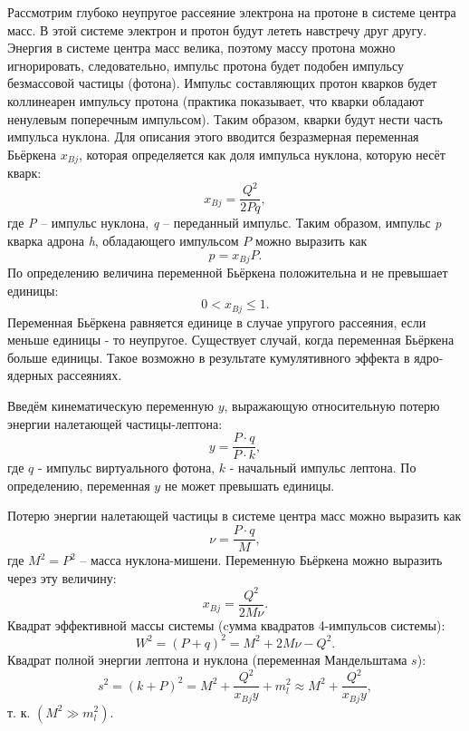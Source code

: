 \documentclass{extarticle}
\begin{document}
Рассмотрим глубоко неупругое рассеяние электрона на протоне в системе центра масс. В этой системе электрон и протон будут лететь навстречу друг другу. Энергия в системе центра масс велика, поэтому массу протона можно игнорировать, следовательно, импульс протона будет подобен импульсу безмассовой частицы (фотона). Импульс составляющих протон кварков будет коллинеарен импульсу протона (практика показывает, что кварки обладают ненулевым поперечным импульсом). Таким образом, кварки будут нести часть импульса нуклона. Для описания этого вводится безразмерная переменная Бьёркена $x_{Bj}$, которая определяется как доля импульса нуклона, которую несёт кварк:
\begin{equation}
    x_{Bj}= \frac{Q^2}{2Pq},
\end{equation}
где \textit{P} -- импульс нуклона, \textit{q} -- переданный импульс. 
Таким образом, импульс \textit{p} кварка адрона \textit{h}, обладающего импульсом $P$ можно выразить как
\begin{equation}
    p=x_{Bj}P.
\end{equation}
По определению величина переменной Бьёркена положительна и не превышает единицы: 
\begin{equation}
    0 < x_{Bj} \leq 1.
\end{equation}
Переменная Бьёркена равняется единице в случае упругого рассеяния, если меньше единицы - то неупругое. Существует случай, когда переменная Бьёркена больше единицы. Такое возможно в результате кумулятивного эффекта в ядро-ядерных рассеяниях.

Введём кинематическую переменную $y$, выражающую относительную потерю энергии налетающей частицы-лептона:
\begin{equation}
    y = \frac{P \cdot q}{P \cdot k},
\end{equation}
где $q$ - импульс виртуального фотона, $k$ - начальный импульс лептона. По определению, переменная $y$ не может превышать единицы.

Потерю энергии налетающей частицы в системе центра масс можно выразить как 
\begin{equation}
    \nu = \frac{P \cdot q}{M},
\end{equation}
где $M^2 = P^2$ -- масса нуклона-мишени. Переменную Бьёркена можно выразить через эту величину:
\begin{equation}
    x_{Bj} = \frac{Q^2}{2M\nu}.
\end{equation}
Квадрат эффективной массы системы (cумма квадратов 4-импульсов системы):
\begin{equation}
	W^2 = (P+q)^2 = M^2 + 2M\nu - Q^2.
\end{equation}
Квадрат полной энергии лептона и нуклона (переменная Мандельштама $s$):
\begin{equation}
	s^2 = (k+P)^2 = M^2 + \frac{Q^2}{x_{Bj}y} + m_l^2 \approx M^2 + \frac{Q^2}{x_{Bj}y}, 
\end{equation}
т. к. $(M^2 \gg m_l^2)$. 
\end{document}
